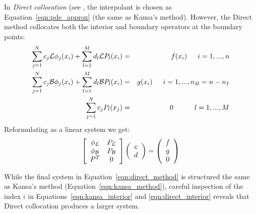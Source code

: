 \documentclass{report}
\begin{document}
{In \emph{Direct collocation} (see \cite{Larsson2003, Fedoseyev2002}, the interpolant is chosen as Equation~\ref{eqn:pde_approx} (the same as Kansa's method). However, the Direct method collocates both the interior and boundary operators at the boundary points:
\begin{eqnarray}
\sum_{j=1}^{N}c_j\mathcal{L}\phi_j(x_i) + \sum_{l=1}^{M}d_l \mathcal{L}P_l(x_i) &=&f(x_i)  \hskip1.5em i = 1,...,n  \label{eqn:direct_interior} \\ 
\sum_{j=1}^{N}c_j\mathcal{B}\phi_j(x_i) + \sum_{l=1}^{M}d_l \mathcal{B}P_l(x_i) &=& g(x_i)  \hskip1.5em i = 1,..., n_B=n-n_I \label{eqn:direct_boundary} \\
 \sum_{j=1}^{N} c_j P_l(x_j) &=& 0 \hskip3.0em l=1,...,M \label{eqn:direct_constraints} 
\end{eqnarray}
Reformulating as a linear system we get: 
\begin{eqnarray}
\left[ \begin{array}{c c} 
	\phi_{\mathcal{L}} & P_{\mathcal{L}} \\
	\phi_{\mathcal{B}} & P_{\mathcal{B}} \\
	P^T  & 0 \\
	\end{array} \right] \left( \begin{array}{c}
							{c} \\
							{d}
							 \end{array}
						 \right) = \left( \begin{array}{c}
							{f} \\
							{g} \\
							0
							 \end{array}
						 \right) 
	\label{eqn:direct_method}
\end{eqnarray}

While the final system in Equation~\ref{eqn:direct_method} is structured the same as Kansa's method (Equation~\ref{eqn:kansa_method}), %
careful inspection of the index $i$ in Equations~\ref{eqn:kansa_interior} and \ref{eqn:direct_interior} reveals that Direct collocation produces a larger system. %

}
\end{document}
